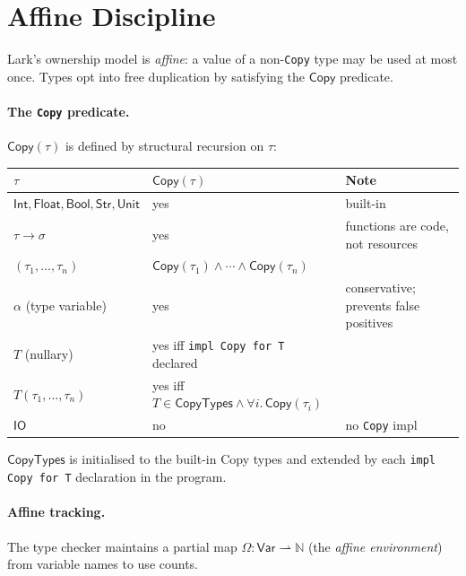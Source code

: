 \documentclass[10pt,a4paper]{article}
\newcommand{\TInt}{\mathsf{Int}}
\newcommand{\TFlt}{\mathsf{Float}}
\newcommand{\TBool}{\mathsf{Bool}}
\newcommand{\TStr}{\mathsf{Str}}
\newcommand{\TUnit}{\mathsf{Unit}}
\newcommand{\TIO}{\mathsf{IO}}
\newcommand{\TCopy}{\mathsf{Copy}}
\theoremstyle{plain}
\theoremstyle{definition}
\theoremstyle{remark}
\begin{document}
\section{Affine Discipline}
\label{sec:affine}

Lark's ownership model is \emph{affine}: a value of a non-\texttt{Copy} type
may be used at most once.  Types opt into free duplication by satisfying the
$\TCopy$ predicate.

\paragraph{The \texttt{Copy} predicate.}
$\TCopy(\tau)$ is defined by structural recursion on $\tau$:
\begin{center}
\renewcommand{\arraystretch}{1.25}
\begin{tabular}{@{}lll@{}}
\toprule
$\tau$ & $\TCopy(\tau)$ & Note \\
\midrule
$\TInt,\TFlt,\TBool,\TStr,\TUnit$ & yes & built-in \\
$\tau\to\sigma$                    & yes & functions are code, not resources \\
$(\tau_1,\ldots,\tau_n)$           & $\TCopy(\tau_1)\wedge\cdots\wedge\TCopy(\tau_n)$ & \\
$\alpha$ (type variable)           & yes & conservative; prevents false positives \\
$T$ (nullary)                      & yes iff \texttt{impl Copy for T} declared & \\
$T(\tau_1,\ldots,\tau_n)$          & yes iff $T\in\mathsf{CopyTypes}\wedge\forall i.\,\TCopy(\tau_i)$ & \\
$\TIO$                             & no & no \texttt{Copy} impl \\
\bottomrule
\end{tabular}
\end{center}
\noindent $\mathsf{CopyTypes}$ is initialised to the built-in Copy types and
extended by each \texttt{impl Copy for T} declaration in the program.

\paragraph{Affine tracking.}
The type checker maintains a partial map
$\Omega : \mathsf{Var}\rightharpoonup\mathbb{N}$ (the \emph{affine
environment}) from variable names to use counts.
\end{document}

